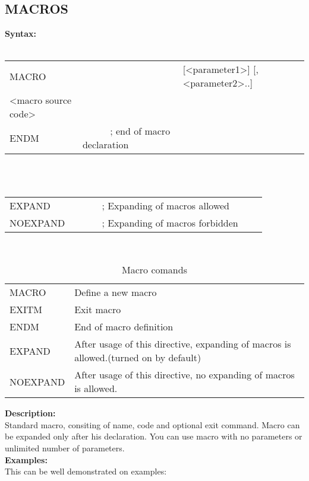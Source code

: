                 \subsection{MACROS}
                \textbf{Syntax:}\\
                \\ {
                    \texttt{}
                        \begin{tabular}[h!]{llll}
                            { \color{highlight_directive} MACRO } & \verb'     ' &
                            { \color{highlight_constant} [<parameter1>]  [,<parameter2>..] }\\
                            { \color{highlight_symbol} <macro source code> }\\
                            { \color{highlight_directive} ENDM } &  \verb'     ' { \color{highlight_comment} ; end of macro declaration  }
                        \end{tabular}
                    }\\
                \\ {
                    \texttt{}
                        \begin{tabular}[h!]{llll}
                            { \color{highlight_directive} EXPAND } &  \verb'     ' { \color{highlight_comment} ; Expanding of macros allowed  }\\
                            { \color{highlight_directive} NOEXPAND } &  \verb'     ' { \color{highlight_comment} ; Expanding of macros forbidden  }
                        \end{tabular}
                    }\\
                \begin{table}[h!]
                    \begin{tabular}{|ll|}
                            \hline
                            MACRO      & Define a new macro \\
                            EXITM      & Exit macro  \\
                            ENDM       & End of macro definition \\
                            EXPAND     & After usage of this directive, expanding of macros is allowed.(turned on by default)\\
                            NOEXPAND   & After usage of this directive, no expanding of macros is allowed.\\
                            \hline
                    \end{tabular}
                    \caption{Macro comands}
                \end{table}
                \textbf{Description:}\\
                Standard macro, consiting of name, code and optional exit command. Macro can be expanded only after his declaration. You can use macro
                with no parameters  or unlimited number of parameters.\\
                \textbf{Examples:}\\
                This can be well demonstrated on examples:

